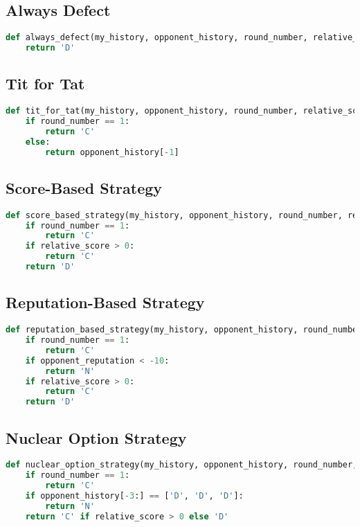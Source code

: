 \documentclass[11pt]{article}
\begin{document}
\subsection*{Always Defect}
\begin{lstlisting}[language=Python]
def always_defect(my_history, opponent_history, round_number, relative_score, opponent_reputation):
    return 'D'
\end{lstlisting}

\subsection*{Tit for Tat}
\begin{lstlisting}[language=Python]
def tit_for_tat(my_history, opponent_history, round_number, relative_score, opponent_reputation):
    if round_number == 1:
        return 'C'
    else:
        return opponent_history[-1]
\end{lstlisting}

\subsection*{Score-Based Strategy}
\begin{lstlisting}[language=Python]
def score_based_strategy(my_history, opponent_history, round_number, relative_score, opponent_reputation):
    if round_number == 1:
        return 'C'
    if relative_score > 0:
        return 'C'
    return 'D'
\end{lstlisting}

\subsection*{Reputation-Based Strategy}
\begin{lstlisting}[language=Python]
def reputation_based_strategy(my_history, opponent_history, round_number, relative_score, opponent_reputation):
    if round_number == 1:
        return 'C'
    if opponent_reputation < -10:
        return 'N'
    if relative_score > 0:
        return 'C'
    return 'D'
\end{lstlisting}

\subsection*{Nuclear Option Strategy}
\begin{lstlisting}[language=Python]
def nuclear_option_strategy(my_history, opponent_history, round_number, relative_score, opponent_reputation):
    if round_number == 1:
        return 'C'
    if opponent_history[-3:] == ['D', 'D', 'D']:
        return 'N'
    return 'C' if relative_score > 0 else 'D'
\end{lstlisting}
\end{document}
